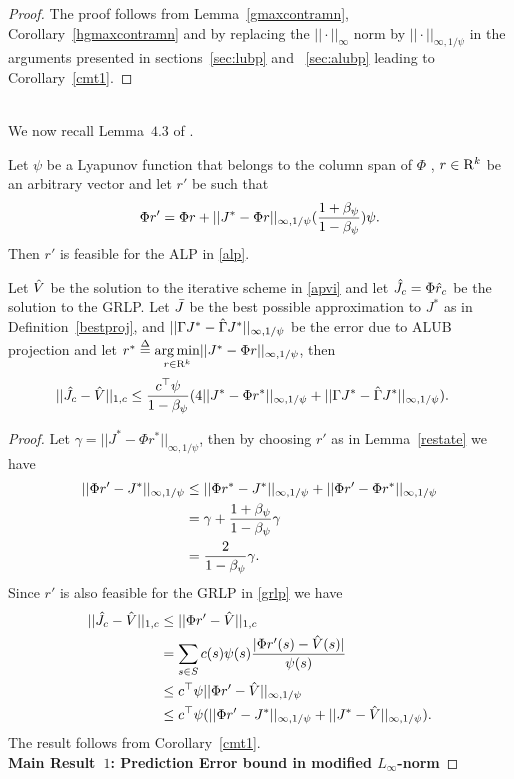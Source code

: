 \begin{proof}
The proof follows from Lemma~\ref{gmaxcontramn}, Corollary~\ref{hgmaxcontramn} and by replacing the $||\cdot||_\infty$ norm by $||\cdot||_{\infty,1/\psi}$ in the arguments presented in sections~\ref{sec:lubp} and ~\ref{sec:alubp} leading to Corollary~\ref{cmt1}.
\end{proof}\\
We now recall Lemma~$4.3$ of \cite{ALP}.
\begin{lemma}\label{restate}
Let $\psi$ be a Lyapunov function that belongs to the column span of $\Phi$ , $r \in \mathrm{R}^k$ be an arbitrary vector and let $r'$ be such that
\begin{align}
\Phi r'=\Phi r+||J^*-\Phi r||_{\infty,1/\psi}(\frac{1+\beta_{\psi}}{1-\beta_{\psi}})\psi.
\end{align}
Then $r'$ is feasible for the ALP in \eqref{alp}.
\end{lemma}
\begin{theorem}\label{mt2mn}
Let $\hat{V}$ be the solution to the iterative scheme in \eqref{apvi} and let $\hat{J}_c=\Phi \hat{r}_c$ be the solution to the GRLP. Let $\bar{J}$ be the best possible approximation to $J^*$ as in Definition~\ref{bestproj}, and $||\Gamma J^* -\hat{\Gamma} J^*||_{\infty,1/\psi}$ be the error due to ALUB projection and let $r^*\stackrel{\Delta}{=}\underset{r\in \mathrm{R}^k}{\arg\min}||J^*-\Phi r||_{\infty,1/\psi}$, then
\begin{align}
||\hat{J}_c-\hat{V}||_{1,c}&\leq \frac{c^\top \psi}{1-\beta_\psi}(4||J^*-\Phi r^*||_{\infty,1/\psi}
+||\Gamma J^*-\hat{\Gamma} J^*||_{\infty,1/\psi}).
\end{align}
\end{theorem}
\begin{proof}
Let $\gamma=||J^*-\Phi r^*||_{\infty,1/\psi}$, then by choosing $r'$ as in Lemma~\ref{restate} we have
\begin{align}
||\Phi r'-J^*||_{\infty,1/\psi}&\leq ||\Phi r^*-J^*||_{\infty,1/\psi}+||\Phi r'-\Phi r^*||_{\infty,1/\psi}\nonumber\\
&=\gamma+\frac{1+\beta_\psi}{1-\beta_\psi}\gamma\nonumber\\
&=\frac{2}{1-\beta_\psi}\gamma.\nonumber
\end{align}
Since $r'$ is also feasible for the GRLP in \eqref{grlp} we have
\begin{align}
||\hat{J}_c-\hat{V}||_{1,c}&\leq||\Phi r'-\hat{V}||_{1,c}\nonumber\\
&=\sum_{s\in S}c(s)\psi(s)\frac{|\Phi r'(s)-\hat{V}(s)|}{\psi(s)}\nonumber\\
&\leq c^\top \psi ||\Phi r'-\hat{V}||_{\infty,1/\psi}\nonumber\\
&\leq c^\top \psi (||\Phi r'-J^*||_{\infty,1/\psi}+||J^*-\hat{V}||_{\infty,1/\psi}).
\end{align}
The result follows from Corollary~\ref{cmt1}.\\
\textbf{Main Result~$1$: Prediction Error bound in modified $L_\infty$-norm}
\end{proof}
